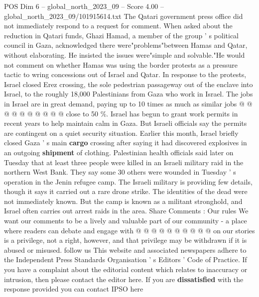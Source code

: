 \begin{textsample}{POS Dim 6 – global\_north\_2023\_09 – Score 4.00 – global\_north\_2023\_09/101915614.txt}
The Qatari government press office did not immediately respond to a request for comment.
When asked about the reduction in Qatari funds, Ghazi Hamad, a member of the group ' s political council in Gaza, acknowledged there were"problems"between Hamas and Qatar, without elaborating.
He insisted the issues were"simple and solvable."He would not comment on whether Hamas was using the border protests as a pressure tactic to wring concessions out of Israel and Qatar.
In response to the protests, Israel closed Erez crossing, the sole pedestrian passageway out of the enclave into Israel, to the roughly 18,000 Palestinians from Gaza who work in Israel.
The jobs in Israel are in great demand, paying up to 10 times as much as similar jobs @ @ @ @ @ @ @ @ @ @ close to 50 \%.
Israel has begun to grant work permits in recent years to help maintain calm in Gaza.
But Israeli officials say the permits are contingent on a quiet security situation.
Earlier this month, Israel briefly closed Gaza ' s main \textbf{cargo} crossing after saying it had discovered explosives in an outgoing \textbf{shipment} of clothing.
Palestinian health officials said later on Tuesday that at least three people were killed in an Israeli military raid in the northern West Bank.
They say some 30 others were wounded in Tuesday ' s operation in the Jenin refugee camp.
The Israeli military is providing few details, though it says it carried out a rare drone strike.
The identities of the dead were not immediately known.
But the camp is known as a militant stronghold, and Israel often carries out arrest raids in the area.
Share Comments : Our rules We want our comments to be a lively and valuable part of our community - a place where readers can debate and engage with @ @ @ @ @ @ @ @ @ @ on our stories is a privilege, not a right, however, and that privilege may be withdrawn if it is abused or misused. follow us This website and associated newspapers adhere to the Independent Press Standards Organisation ' s Editors ' Code of Practice.
If you have a complaint about the editorial content which relates to inaccuracy or intrusion, then please contact the editor here.
If you are \textbf{dissatisfied} with the response provided you can contact IPSO here

\end{textsample}
